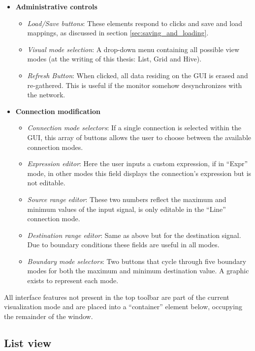 \begin{itemize}
	\item \textbf{Administrative controls}
	\begin{itemize}
		\item\emph{Load/Save buttons}: These elements respond to clicks and save and load mappings, as discussed in section \ref{sec:saving_and_loading}.
		\item\emph{Visual mode selection}: A drop-down menu containing all possible view modes (at the writing of this thesis: List, Grid and Hive).
		\item\emph{Refresh Button}: When clicked, all data residing on the GUI is erased and re-gathered. This is useful if the monitor somehow desynchronizes with the network.
	\end{itemize}

	\item \textbf{Connection modification}
	\begin{itemize}
		\item\emph{Connection mode selectors}: If a single connection is selected within the GUI, this array of buttons allows the user to choose between the available connection modes.
		\item\emph{Expression editor}: Here the user inputs a custom expression, if in ``Expr'' mode, in other modes this field displays the connection's expression but is not editable.
		\item\emph{Source range editor}: These two numbers reflect the maximum and minimum values of the input signal, is only editable in the ``Line'' connection mode.
		\item\emph{Destination range editor}: Same as above but for the destination signal. Due to boundary conditions these fields are useful in all modes.
		\item\emph{Boundary mode selectors}: Two buttons that cycle through five boundary modes for both the maximum and minimum destination value. A graphic exists to represent each mode.
	\end{itemize}
\end{itemize}

All interface features not present in the top toolbar are part of the current visualization mode and are placed into a ``container'' element below, occupying the remainder of the window.

\subsection{List view}
\label{sec:list_view}


